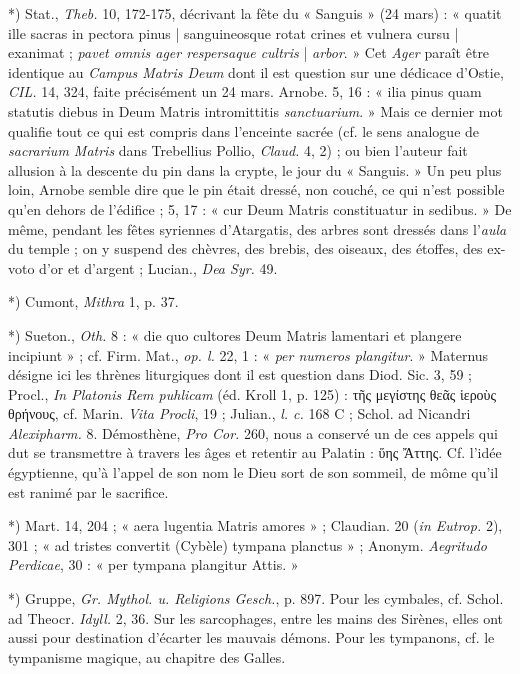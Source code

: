 \documentclass[a4paper, 11pt, oneside, polutonikogreek, french]{article}
\begin{document}
*) Stat., \emph{Theb.} 10, 172-175, décrivant la fête du « Sanguis » (24 mars) : « quatit ille sacras in pectora pinus | sanguineosque rotat crines et vulnera cursu | exanimat ; \emph{pavet omnis ager respersaque cultris} | \emph{arbor}. » Cet \emph{Ager} paraît être identique au \emph{Campus Matris Deum} dont il est question sur une dédicace d'Ostie, \emph{CIL.} 14, 324, faite précisément un 24 mars. Arnobe. 5, 16 : « ilia pinus quam statutis diebus in Deum Matris intromittitis \emph{sanctuarium}. » Mais ce dernier mot qualifie tout ce qui est compris dans l'enceinte sacrée (cf. le sens analogue de \emph{sacrarium Matris} dans Trebellius Pollio, \emph{Claud.} 4, 2) ; ou bien l'auteur fait allusion à la descente du pin dans la crypte, le jour du « Sanguis. » Un peu plus loin, Arnobe semble dire que le pin était dressé, non couché, ce qui n'est possible qu'en dehors de l'édifice ; 5, 17 : « cur Deum Matris constituatur in sedibus. » De même, pendant les fêtes syriennes d'Atargatis, des arbres sont dressés dans l'\emph{aula} du temple ; on y suspend des chèvres, des brebis, des oiseaux, des étoffes, des ex-voto d'or et d'argent ; Lucian., \emph{Dea Syr.} 49.

*) Cumont, \emph{Mithra} 1, p. 37.

*) Sueton., \emph{Oth.} 8 : « die quo cultores Deum Matris lamentari et plangere incipiunt » ; cf. Firm. Mat., \emph{op. l.} 22, 1 : « \emph{per numeros plangitur}. » Maternus désigne ici les thrènes liturgiques dont il est question dans Diod. Sic. 3, 59 ; Procl., \emph{In Platonis Rem puhlicam} (éd. Kroll 1, p. 125) : τῆς μεγίστης θεᾶς ἱεροὺς θρήνους, cf. Marin. \emph{Vita Procli}, 19 ; Julian., \emph{l. c.} 168 C ; Schol. ad Nicandri \emph{Alexipharm.} 8. Démosthène, \emph{Pro Cor.} 260, nous a conservé un de ces appels qui dut se transmettre à travers les âges et retentir au Palatin : ὕης Ἄττης. Cf. l'idée égyptienne, qu'à l'appel de son nom le Dieu sort de son sommeil, de môme qu'il est ranimé par le sacrifice.

*) Mart. 14, 204 ; « aera lugentia Matris amores » ; Claudian. 20 (\emph{in Eutrop.} 2), 301 ; « ad tristes convertit (Cybèle) tympana planctus » ; Anonym. \emph{Aegritudo Perdicae}, 30 : « per tympana plangitur Attis. »

*) Gruppe, \emph{Gr. Mythol. u. Religions Gesch.}, p. 897. Pour les cymbales, cf. Schol. ad Theocr. \emph{Idyll.} 2, 36. Sur les sarcophages, entre les mains des Sirènes, elles ont aussi pour destination d'écarter les mauvais démons. Pour les tympanons, cf. le tympanisme magique, au chapitre des Galles.
\end{document}
